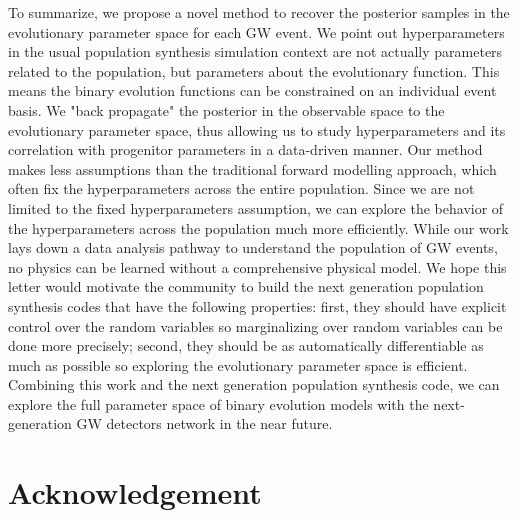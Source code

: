 \documentclass[twocolumn]{aastex631}
\begin{document}
To summarize, we propose a novel method to recover the posterior samples in the evolutionary parameter space for each GW event.
We point out hyperparameters in the usual population synthesis simulation context are not actually parameters related to the population,
but parameters about the evolutionary function.
This means the binary evolution functions can be constrained on an individual event basis.
We "back propagate" the posterior in the observable space to the evolutionary parameter space,
thus allowing us to study hyperparameters and its correlation with progenitor parameters in a data-driven manner.
Our method makes less assumptions than the traditional forward modelling approach,
which often fix the hyperparameters across the entire population.
Since we are not limited to the fixed hyperparameters assumption, we can explore the behavior of the hyperparameters across the population much more efficiently.
While our work lays down a data analysis pathway to understand the population of GW events,
no physics can be learned without a comprehensive physical model.
We hope this letter would motivate the community to build the next generation population synthesis codes that have the following properties:
first, they should have explicit control over the random variables so marginalizing over random variables can be done more precisely;
second, they should be as automatically differentiable as much as possible so exploring the evolutionary parameter space is efficient.
Combining this work and the next generation population synthesis code,
we can explore the full parameter space of binary evolution models with the next-generation GW detectors network in the near future.


\section{Acknowledgement}


\end{document}
